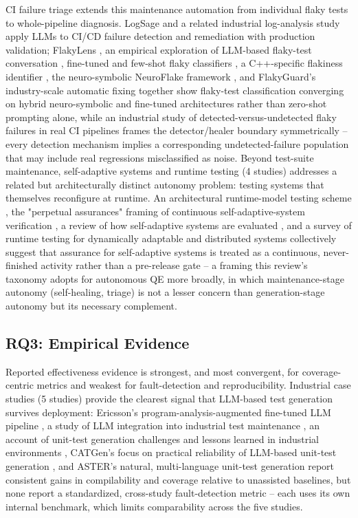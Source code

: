 CI failure triage extends this maintenance automation from individual
flaky tests to whole-pipeline diagnosis. LogSage \cite{slr0422025}
and a related industrial log-analysis study \cite{slr0432026} apply
LLMs to CI/CD failure detection and remediation with production
validation; FlakyLens \cite{slr0442025}, an empirical exploration of
LLM-based flaky-test conversation \cite{slr0452026}, fine-tuned and
few-shot flaky classifiers \cite{slr0462025}, a C++-specific
flakiness identifier \cite{slr0472024}, the neuro-symbolic NeuroFlake
framework \cite{slr0482026}, and FlakyGuard's industry-scale automatic
fixing \cite{slr0492025} together show flaky-test classification
converging on hybrid neuro-symbolic and fine-tuned architectures
rather than zero-shot prompting alone, while an industrial study of
detected-versus-undetected flaky failures in real CI pipelines
\cite{leinen2026detectedundetected} frames the detector/healer
boundary symmetrically -- every detection mechanism implies a
corresponding undetected-failure population that may include real
regressions misclassified as noise. Beyond test-suite maintenance,
self-adaptive systems and runtime testing (4 studies) addresses a
related but architecturally distinct autonomy problem: testing
systems that themselves reconfigure at runtime. An architectural
runtime-model testing scheme \cite{hnsel2018}, the "perpetual
assurances" framing of continuous self-adaptive-system verification
\cite{weyns2019}, a review of how self-adaptive systems are evaluated
\cite{wohlrab2021}, and a survey of runtime testing for dynamically
adaptable and distributed systems \cite{sa42021} collectively suggest
that assurance for self-adaptive systems is treated as a continuous,
never-finished activity rather than a pre-release gate -- a framing
this review's taxonomy adopts for autonomous QE more broadly, in which
maintenance-stage autonomy (self-healing, triage) is not a lesser
concern than generation-stage autonomy but its necessary complement.

\subsection{RQ3: Empirical Evidence}
\label{subsec:rq3-evidence}

Reported effectiveness evidence is strongest, and most convergent,
for coverage-centric metrics and weakest for fault-detection and
reproducibility. Industrial case studies (5 studies) provide the
clearest signal that LLM-based test generation survives deployment:
Ericsson's program-analysis-augmented fine-tuned LLM pipeline
\cite{slr0372025}, a study of LLM integration into industrial test
maintenance \cite{slr0382024}, an account of unit-test generation
challenges and lessons learned in industrial environments
\cite{slr0392025}, CATGen's focus on practical reliability of
LLM-based unit-test generation \cite{slr0402026}, and ASTER's
natural, multi-language unit-test generation \cite{slr0412025} report
consistent gains in compilability and coverage relative to
unassisted baselines, but none report a standardized, cross-study
fault-detection metric -- each uses its own internal benchmark, which
limits comparability across the five studies.

